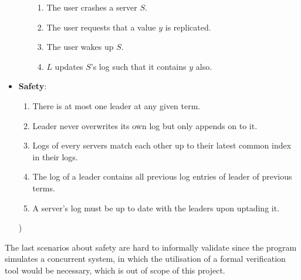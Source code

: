 \begin{itemize}
\begin{enumerate}
\begin{enumerate}
        \item The user crashes a server $S$.
        \item The user requests that a value $y$ is replicated.
        \item The user wakes up $S$.
        \item $L$ updates $S$'s log such that it contains $y$ also.
        \end{enumerate}
    \end{enumerate}
\item \textbf{Safety}:
    \begin{enumerate}
    \item There is at most one leader at any given term.
    \item Leader never overwrites its own log but only appends on to it.
    \item Logs of every servers match each other up to their latest common index in their logs.
    \item The log of a leader contains all previous log entries of leader of previous terms.
    \item A server's log must be up to date with the leaders upon uptading it.
    \end{enumerate})
\end{itemize}

The last scenarios about safety are hard to informally validate since the program simulates a concurrent system, in which the utilisation of a formal verification tool would be necessary, which is out of scope of this project. %

    

